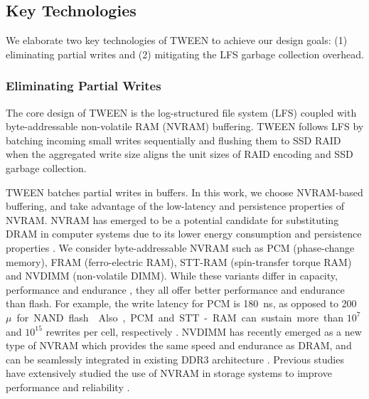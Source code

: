 \subsection{Key Technologies}
\label{subsec:key}

We elaborate two key technologies of TWEEN to achieve our design goals: (1)
eliminating partial writes and (2) mitigating the LFS garbage collection
overhead. 

\subsubsection{Eliminating Partial Writes}
\label{subsubsec:eliminating}

The core design of TWEEN is the log-structured file system (LFS)
\cite{rosenblum92} coupled with byte-addressable non-volatile RAM (NVRAM) buffering.  
TWEEN follows LFS \cite{rosenblum92} by batching incoming small writes
sequentially and flushing them to SSD RAID when the aggregated write size
aligns the unit sizes of RAID encoding and SSD garbage collection. 


TWEEN batches partial writes in buffers.  In this work, we choose NVRAM-based
buffering, and take advantage of the low-latency and persistence properties of
NVRAM.  NVRAM has emerged to be a potential candidate for substituting DRAM in
computer systems due to its lower energy consumption and persistence
properties \cite{zhou09,lee14}.  We consider byte-addressable NVRAM such as
PCM (phase-change memory), FRAM (ferro-electric RAM), STT-RAM
(spin-transfer torque RAM) and NVDIMM (non-volatile DIMM).  While these variants differ in capacity,
performance and endurance \cite{jung10}, they all offer better performance and
endurance than flash.  For example, the write latency for PCM is
\SI{180}{\nano\second}, as opposed to \SI{200}{$\mu$\second} for NAND flash
\cite{jung10}.  Also, PCM and
STT-RAM can sustain more than $10^7$ and $10^{15}$ rewrites per cell,
respectively \cite{jung10,zhou09}. NVDIMM has recently
emerged as a new type of NVRAM which provides the same speed and endurance as DRAM,
and can be seamlessly integrated in existing DDR3 architecture \cite{viking}.
Previous studies have extensively studied
the use of NVRAM in storage systems to improve performance and reliability
\cite{jung10,venkataraman11,zhou09,qiu13,lee14}.  


